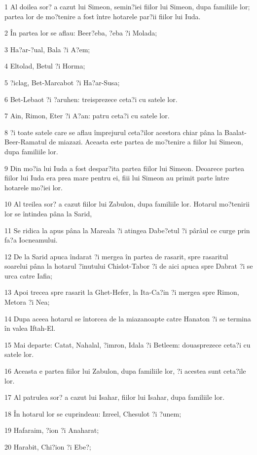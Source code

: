 \par 1 Al doilea sor? a cazut lui Simeon, semin?iei fiilor lui Simeon, dupa familiile lor; partea lor de mo?tenire a fost între hotarele par?ii fiilor lui Iuda.
\par 2 În partea lor se aflau: Beer?eba, ?eba ?i Molada;
\par 3 Ha?ar-?ual, Bala ?i A?em;
\par 4 Eltolad, Betul ?i Horma;
\par 5 ?iclag, Bet-Marcabot ?i Ha?ar-Susa;
\par 6 Bet-Lebaot ?i ?aruhen: treisprezece ceta?i cu satele lor.
\par 7 Ain, Rimon, Eter ?i A?an: patru ceta?i cu satele lor.
\par 8 ?i toate satele care se aflau împrejurul ceta?ilor acestora chiar pâna la Baalat-Beer-Ramatul de miazazi. Aceasta este partea de mo?tenire a fiilor lui Simeon, dupa familiile lor.
\par 9 Din mo?ia lui Iuda a fost despar?ita partea fiilor lui Simeon. Deoarece partea fiilor lui Iuda era prea mare pentru ei, fiii lui Simeon au primit parte între hotarele mo?iei lor.
\par 10 Al treilea sor? a cazut fiilor lui Zabulon, dupa familiile lor. Hotarul mo?tenirii lor se întindea pâna la Sarid,
\par 11 Se ridica la apus pâna la Mareala ?i atingea Dabe?etul ?i pârâul ce curge prin fa?a Iocneamului.
\par 12 De la Sarid apuca îndarat ?i mergea în partea de rasarit, spre rasaritul soarelui pâna la hotarul ?inutului Chislot-Tabor ?i de aici apuca spre Dabrat ?i se urca catre Iafia;
\par 13 Apoi trecea spre rasarit la Ghet-Hefer, la Ita-Ca?in ?i mergea spre Rimon, Metora ?i Nea;
\par 14 Dupa aceea hotarul se întorcea de la miazanoapte catre Hanaton ?i se termina în valea Iftah-El.
\par 15 Mai departe: Catat, Nahalal, ?imron, Idala ?i Betleem: douasprezece ceta?i cu satele lor.
\par 16 Aceasta e partea fiilor lui Zabulon, dupa familiile lor, ?i acestea sunt ceta?ile lor.
\par 17 Al patrulea sor? a cazut lui Isahar, fiilor lui Isahar, dupa familiile lor.
\par 18 În hotarul lor se cuprindeau: Izreel, Chesulot ?i ?unem;
\par 19 Hafaraim, ?ion ?i Anaharat;
\par 20 Harabit, Chi?ion ?i Ebe?;
